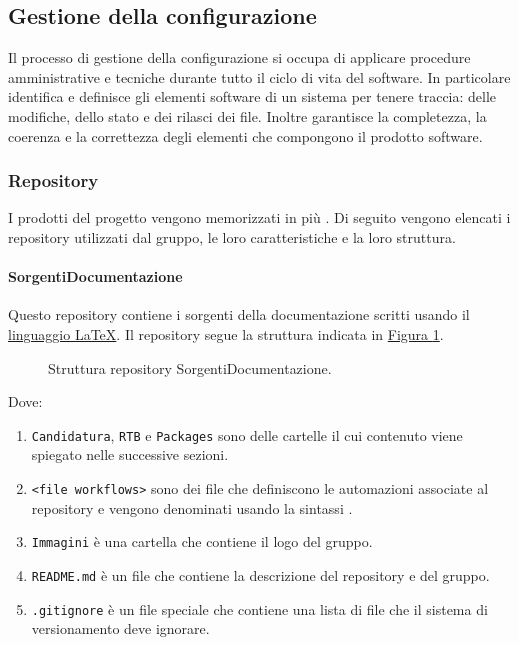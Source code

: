 \subsection{Gestione della configurazione}
\label{subsec:gestione_della_configurazione}
Il processo di gestione della configurazione si occupa di applicare procedure amministrative e tecniche durante tutto il ciclo di vita del software. 
In particolare identifica e definisce gli elementi software di un sistema per tenere traccia: delle modifiche, dello stato e dei rilasci dei file.
Inoltre garantisce la completezza, la coerenza e la correttezza degli elementi che compongono il prodotto software.

\subsubsection{Repository}
\label{subsubsec:repository}
I prodotti del progetto vengono memorizzati in più .
Di seguito vengono elencati i repository utilizzati dal gruppo, le loro caratteristiche e la loro struttura.

\paragraph{SorgentiDocumentazione}
Questo repository contiene i sorgenti della documentazione scritti usando il \hyperref[par:latex]{linguaggio LaTeX}.
Il repository segue la struttura indicata in \hyperref[fig:repo_sorgenti_documenti]{Figura \ref{fig:repo_sorgenti_documenti}}.
\begin{figure}[H]
    \caption{Struttura repository SorgentiDocumentazione.}
    \label{fig:repo_sorgenti_documenti}
\end{figure}
Dove:
\begin{enumerate}
    \item \texttt{Candidatura}, \texttt{RTB} e \texttt{Packages} sono delle cartelle il cui contenuto viene spiegato nelle successive sezioni.
    \item \texttt{<file workflows>} sono dei file che definiscono le automazioni associate al repository e vengono denominati usando la sintassi .
    \item \texttt{Immagini} è una cartella che contiene il logo del gruppo.
    \item \texttt{README.md} è un file che contiene la descrizione del repository e del gruppo.
    \item \texttt{.gitignore} è un file speciale che contiene una lista di file che il sistema di versionamento deve ignorare.
\end{enumerate}

